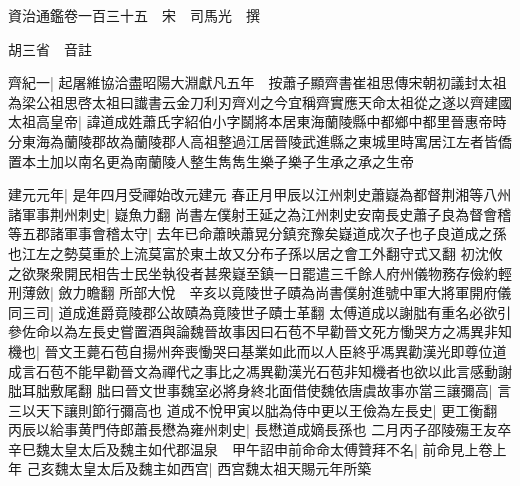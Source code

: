 資治通鑑卷一百三十五　宋　司馬光　撰

胡三省　音註

齊紀一|{
	起屠維協洽盡昭陽大淵獻凡五年　按蕭子顯齊書崔祖思傳宋朝初議封太祖為梁公祖思啓太祖曰䜟書云金刀利刃齊刈之今宜稱齊實應天命太祖從之遂以齊建國}
太祖高皇帝|{
	諱道成姓蕭氏字紹伯小字鬬將本居東海蘭陵縣中都鄉中都里晉惠帝時分東海為蘭陵郡故為蘭陵郡人高祖整過江居晉陵武進縣之東城里時寓居江左者皆僑置本土加以南名更為南蘭陵人整生雋雋生樂子樂子生承之承之生帝}


建元元年|{
	是年四月受禪始改元建元}
春正月甲辰以江州刺史蕭嶷為都督荆湘等八州諸軍事荆州刺史|{
	嶷魚力翻}
尚書左僕射王延之為江州刺史安南長史蕭子良為督會稽等五郡諸軍事會稽太守|{
	去年已命蕭映蕭晃分鎮兖豫矣嶷道成次子也子良道成之孫也江左之勢莫重於上流莫富於東土故又分布子孫以居之會工外翻守式又翻}
初沈攸之欲聚衆開民相告士民坐執役者甚衆嶷至鎮一日罷遣三千餘人府州儀物務存儉約輕刑薄斂|{
	斂力瞻翻}
所部大悅　辛亥以竟陵世子賾為尚書僕射進號中軍大將軍開府儀同三司|{
	道成進爵竟陵郡公故賾為竟陵世子賾士革翻}
太傅道成以謝朏有重名必欲引參佐命以為左長史嘗置酒與論魏晉故事因曰石苞不早勸晉文死方慟哭方之馮異非知機也|{
	晉文王薨石苞自揚州奔喪慟哭曰基業如此而以人臣終乎馮異勸漢光即尊位道成言石苞不能早勸晉文為禪代之事比之馮異勸漢光石苞非知機者也欲以此言感動謝朏耳朏敷尾翻}
朏曰晉文世事魏室必將身終北面借使魏依唐虞故事亦當三讓彌高|{
	言三以天下讓則節行彌高也}
道成不悅甲寅以朏為侍中更以王儉為左長史|{
	更工衡翻}
丙辰以給事黄門侍郎蕭長懋為雍州刺史|{
	長懋道成嫡長孫也}
二月丙子邵陵殤王友卒　辛巳魏太皇太后及魏主如代郡温泉　甲午詔申前命命太傅贊拜不名|{
	前命見上卷上年}
己亥魏太皇太后及魏主如西宫|{
	西宫魏太祖天賜元年所築}


